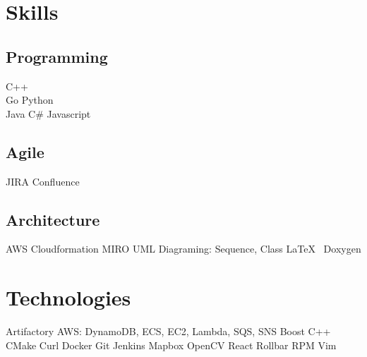 \documentclass[letterpaper]{fowles-resume} %
\begin{document}
\begin{minipage}[t]{0.33\textwidth}


\section{Skills}

\subsection{Programming}
C++ \\
Go \textbullet{} Python\\
Java \textbullet{} C\# \textbullet{} Javascript
\smallskip
\subsection{Agile}
JIRA \textbullet{} Confluence
\smallskip
\subsection{Architecture}
AWS Cloudformation \textbullet{} MIRO \textbullet{} UML Diagraming: Sequence, Class
\textbullet{} \LaTeX\ \textbullet{} Doxygen
\smallskip



\sectionspace %

\section{Technologies}
Artifactory \textbullet{} AWS: DynamoDB, ECS, EC2, Lambda, SQS, SNS \textbullet{} Boost C++ \textbullet{} CMake \textbullet{} Curl \textbullet{} Docker \textbullet{} Git \textbullet{} Jenkins \textbullet{} Mapbox \textbullet{} OpenCV \textbullet{} React \textbullet{} Rollbar \textbullet{} RPM \textbullet{} Vim


\end{minipage}
\end{document}

